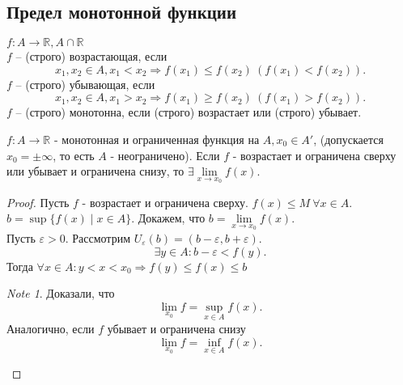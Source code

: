 \documentclass[11pt]{book}
\newcommand{\R}{\mathbb{R}}
\renewcommand{\le}{\leqslant}
\renewcommand{\ge}{\geqslant}
\theoremstyle{definition}
\theoremstyle{plain}
\theoremstyle{plain}
\theoremstyle{definition}
\theoremstyle{remark}
\newtheorem*{note}{Note}
\begin{document}
\subsection{Предел монотонной функции}\label{ques_25}
\begin{defn}
    $f:A \to \R, A \cap \R$ \\
    $f$ -- (строго) возрастающая, если \[
	x_1, x_2 \in A, x_1 <x_2 \Rightarrow f(x_1) \le f(x_2) ~ (f(x_1) < f(x_2))
    .\] 
    $f$ -- (строго) убывающая, если \[
	x_1, x_2 \in A, x_1 > x_2 \Rightarrow f(x_1) \ge f(x_2) ~ (f(x_1) > f(x_2))
    .\] 
    $f$ -- (строго) монотонна, если (строго) возрастает или (строго) убывает.
\end{defn}
\begin{thm}
    $f: A \to \R$ - монотонная и ограниченная функция на $A, x_0 \in A'$, (допускается $x_0 = \pm \infty$, то есть $A$ - неограничено).
    Если $f$ - возрастает и ограничена сверху или убывает и ограничена снизу, то $\exists \lim\limits_{x \to x_0} f(x)$.
\end{thm}
\begin{proof}
    Пусть $f$ - возрастает и ограничена сверху. $f(x) \le  M ~ \forall x \in A$.\\
    $b = \sup \{f(x) \mid x \in A\}$. Докажем, что $b = \lim\limits_{x \to x_0} f(x)$. \\
    Пусть $\varepsilon  > 0$. Рассмотрим $U_{\varepsilon } (b) = (b-\varepsilon , b+\varepsilon )$. 
    \[
	\exists  y \in A: b-\varepsilon < f(y)
    .\] 
    Тогда $\forall x \in A: y < x <x_0 \Rightarrow f(y) \le f(x) \le b$
    \begin{note}
	Доказали, что $$\lim_{x_0} f=\sup\limits_{x \in A} f(x).$$ Аналогично, если $f$ убывает и ограничена снизу $$\lim_{x_0} f = \inf\limits_{x \in  A}f(x).$$
    \end{note}
\end{proof}
\end{document}
